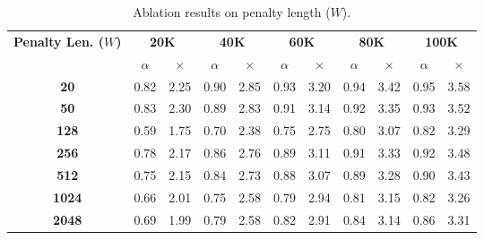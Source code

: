 \begin{table}[ht]
    \renewcommand\arraystretch{1.2}
    \centering
    \small
    \caption{Ablation results on penalty length ($W$).}
    \label{tab:ablation_penalty_len}
    \vskip 0.15in
\begin{tabular}{c|cc|cc|cc|cc|cc}
\toprule
\multirow{2}{*}{\textbf{Penalty Len. ($W$)}} & \multicolumn{2}{c|}{\textbf{20K}} & \multicolumn{2}{c|}{\textbf{40K}} & \multicolumn{2}{c|}{\textbf{60K}} & \multicolumn{2}{c|}{\textbf{80K}} & \multicolumn{2}{c}{\textbf{100K}} \\
                                      & $\alpha$    & $\times$   & $\alpha$    & $\times$   & $\alpha$    & $\times$   & $\alpha$    & $\times$   & $\alpha$    & $\times$   \\ \midrule
\textbf{20}                                    & 0.82        & 2.25       & 0.90        & 2.85       & 0.93        & 3.20       & 0.94        & 3.42       & 0.95        & 3.58       \\
\textbf{50}                                    & 0.83        & 2.30       & 0.89        & 2.83       & 0.91        & 3.14       & 0.92        & 3.35       & 0.93        & 3.52       \\
\textbf{128}                                   & 0.59        & 1.75       & 0.70        & 2.38       & 0.75        & 2.75       & 0.80        & 3.07       & 0.82        & 3.29       \\
\textbf{256}                                   & 0.78        & 2.17       & 0.86        & 2.76       & 0.89        & 3.11       & 0.91        & 3.33       & 0.92        & 3.48       \\
\textbf{512}                                   & 0.75        & 2.15       & 0.84        & 2.73       & 0.88        & 3.07       & 0.89        & 3.28       & 0.90        & 3.43       \\
\textbf{1024}                                  & 0.66        & 2.01       & 0.75        & 2.58       & 0.79        & 2.94       & 0.81        & 3.15       & 0.82        & 3.26       \\
\textbf{2048}                                  & 0.69        & 1.99       & 0.79        & 2.58       & 0.82        & 2.91       & 0.84        & 3.14       & 0.86        & 3.31       \\ \bottomrule
\end{tabular}
\vskip -0.1in
\end{table}
